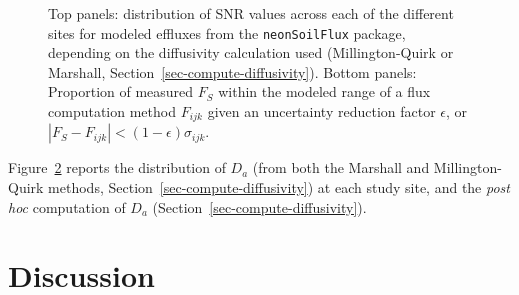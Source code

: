 \documentclass[
  letterpaper,
  DIV=11,
  numbers=noendperiod]{scrartcl}
\begin{document}
\begin{figure}


\caption{\label{fig-uncertainty-stats}Top panels: distribution of SNR
values across each of the different sites for modeled effluxes from the
\texttt{neonSoilFlux} package, depending on the diffusivity calculation
used (Millington-Quirk or Marshall,
Section~\ref{sec-compute-diffusivity}). Bottom panels: Proportion of
measured \(F_{S}\) within the modeled range of a flux computation method
\(F_{ijk}\) given an uncertainty reduction factor \(\epsilon\), or
\(| F_{S} - F_{ijk} | < (1-\epsilon) \sigma_{ijk}\).}

\end{figure}%

Figure~\ref{fig-diffusivity-plot} reports the distribution of \(D_{a}\)
(from both the Marshall and Millington-Quirk methods,
Section~\ref{sec-compute-diffusivity}) at each study site, and the
\emph{post hoc} computation of \(D_{a}\)
(Section~\ref{sec-compute-diffusivity}).

\begin{figure}


\caption{\label{fig-diffusivity-plot}}

\end{figure}%

\section{Discussion}\label{sec-discussion}
\end{document}
